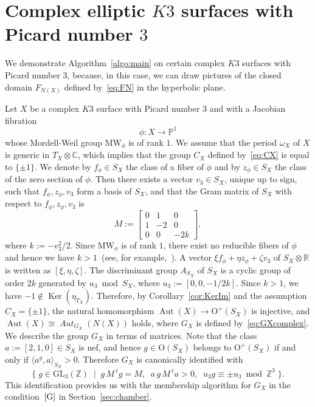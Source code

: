 \documentclass{amsart}
\theoremstyle{plain}
\theoremstyle{definition}
\theoremstyle{remark}
\numberwithin{equation}{section}
\numberwithin{table}{section}
\numberwithin{figure}{section}
\newcommand{\C}{\mathord{\mathbb C}}
\renewcommand{\P}{\mathord{\mathbb  P}}
\newcommand{\R}{\mathord{\mathbb R}}
\newcommand{\Z}{\mathord{\mathbb Z}}
\newcommand{\set}[2]{\{\; {#1} \; \mid \; {#2} \;  \}}
\newcommand{\tensor}{\otimes}
\newcommand{\GL}{\mathord{\mathrm {GL}}}
\newcommand{\OG}{\mathord{\mathrm {O}}}
\newcommand{\Ker}{\operatorname{\mathrm {Ker}}\nolimits}
\newcommand{\Aut}{\operatorname{\mathrm {Aut}}\nolimits}
\newcommand{\MW}{\mathord{\mathrm{MW}}}
\newcommand{\intM}[2]{\langle{#1}\rangle_{#2}}
\newcommand{\aut}{\operatorname{\mathit {Aut}}\nolimits}
\newcommand{\Nc}{N}
\newcommand{\propVG}{\mathord{\rm [G]}}
\begin{document}
\section{Complex elliptic $K3$ surfaces with Picard number $3$}\label{sec:rho3}
%
We demonstrate  Algorithm~\ref{algo:main} on certain complex $K3$ surfaces with Picard number $3$,
because, 
in this case,
we can draw  pictures of the closed domain $F_{\Nc(X)}$  defined by~\eqref{eq:FN} in the hyperbolic plane.
\par
Let $X$ be a complex $K3$ surface with Picard number $3$
and with 
a Jacobian fibration
$$
\phi\colon X\to\P^1
$$
whose Mordell-Weil group $\MW_{\phi}$ is of rank $1$.
We assume  that 
the period $\omega_X$ of $X$ is generic in $T_X\tensor \C$,
which implies that the group $C_X$ defined by~\eqref{eq:CX}
is equal to $\{\pm 1\}$.
We denote by $f_{\phi}\in S_X$ the class of a fiber of $\phi$ and 
by $z_{\phi}\in S_X$ the class of the zero section of $\phi$. 
Then there exists a vector $v_3\in S_X$,
unique up to sign,  such that
$f_{\phi}, z_{\phi}, v_3$ form a basis of $S_X$,
and that the Gram matrix of $S_X$  with respect to $f_{\phi}, z_{\phi}, v_3$ is
$$
M:=\left[
\begin{array}{ccc}
0 & 1 & 0 \\
1 & -2 & 0 \\
0 & 0 & -2k
\end{array}
\right],
$$
where $k:=-v_3^2/2$. 
Since  $\MW_{\phi}$ is of rank $1$,
there exist no reducible fibers of $\phi$ and hence we have $k>1$~(see, for example,~\cite{MR1081832}).
A vector $\xi f_\phi +\eta z_\phi +\zeta v_3$ of $S_X\tensor\R$ is written as $[\xi, \eta, \zeta]$.
The discriminant group $A_{S_X}$ of $S_X$ is 
a cyclic group of order $2k$ generated by
$u_3 \bmod S_X$, where 
$u_3:=[0,0,-1/2k]$.
Since $k>1$, we have $-1\notin \Ker (\eta_{T_X})$.
Therefore, by Corollary~\ref{cor:KerIm} and the assumption $C_X=\{\pm 1\}$,
the natural homomorphism $\Aut(X)\to \OG^+(S_X)$ is injective,
and $\Aut(X)\cong \aut_{G_X}(\Nc(X))$ holds,
where  $G_X$ is defined by~\eqref{eq:GXcomplex}.
We describe the group $G_X$ in terms of matrices.
Note that the class $a:=[2,1,0]\in S_X$ is nef,
and hence $g\in \OG(S_X)$ belongs to $\OG^+(S_X)$ if and only if 
$\intM{a^g, a}{S_X}>0$.
Therefore $G_X$ is canonically identified with 
$$
\set{g\in \GL_3(\Z)}{ g\,M\,{}^t g=M, \;\; a\, g\, M\, {}^ta >0, \;\;  u_3 g\equiv \pm u_3\bmod \Z^3}.
$$
This identification provides us with 
the membership algorithm for $G_X$ in the condition~$\propVG$ in Section~\ref{sec:chamber}.
\end{document}
